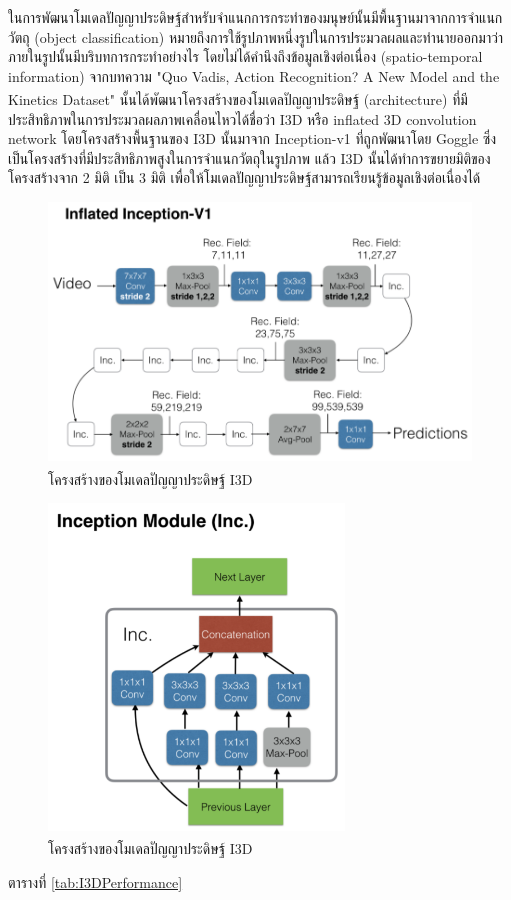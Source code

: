 ในการพัฒนาโมเดลปัญญาประดิษฐ์สำหรับจำแนกการกระทำของมนุษย์นั้นมีพื้นฐานมาจากการจำแนกวัตถุ (object classification)
หมายถึงการใช้รูปภาพหนึ่งรูปในการประมวลผลและทำนายออกมาว่าภายในรูปนั้นมีบริบทการกระทำอย่างไร โดยไม่ได้คำนึงถึงข้อมูลเชิงต่อเนื่อง (spatio-temporal information)
จากบทความ "Quo Vadis, Action Recognition? A New Model and the Kinetics Dataset"\textsuperscript{\cite{I3D}} นั้นได้พัฒนาโครงสร้างของโมเดลปัญญาประดิษฐ์ (architecture) 
ที่มีประสิทธิภาพในการประมวลผลภาพเคลื่อนไหวได้ชื่อว่า I3D หรือ inflated 3D convolution network
โดยโครงสร้างพื้นฐานของ I3D นั้นมาจาก Inception-v1\cite{Inception} ที่ถูกพัฒนาโดย Goggle ซึ่งเป็นโครงสร้างที่มีประสิทธิภาพสูงในการจำแนกวัตถุในรูปภาพ
แล้ว I3D นั้นได้ทำการขยายมิติของโครงสร้างจาก 2 มิติ เป็น 3 มิติ เพื่อให้โมเดลปัญญาประดิษฐ์สามารถเรียนรู้ข้อมูลเชิงต่อเนื่องได้
\begin{figure}[!ht]
    \centering
    \includegraphics[width=1.0\textwidth]{chapter2/images/I3D.png}
    \caption{โครงสร้างของโมเดลปัญญาประดิษฐ์ I3D\textsuperscript{\cite{I3D}}}
    \label{fig:I3DArch}
\end{figure}

\begin{figure}[!ht]
    \centering
    \includegraphics[width=0.7\textwidth]{chapter2/images/inceptionModule.png}
    \caption{โครงสร้างของโมเดลปัญญาประดิษฐ์ I3D\textsuperscript{\cite{I3D}}}
    \label{fig:I3DArch}
\end{figure}
ตารางที่ \ref{tab:I3DPerformance}